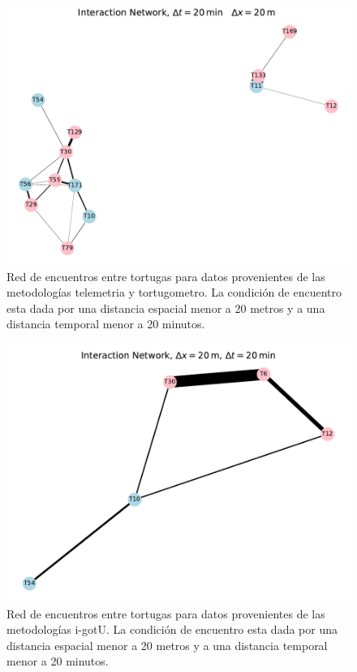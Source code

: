 \begin{figure}[h]
    \begin{center}
       
   
    \includegraphics[width=\imsize]{Chap2/red_interaccion_20min_campanas.pdf}
\end{center}
    \caption[Red de encuentros entre tortugas utilizando telemetria y tortugometro.]{Red de encuentros entre tortugas para datos provenientes de las metodologías telemetria y tortugometro. La condición de encuentro esta dada por una distancia espacial menor a 20 metros y a una distancia temporal menor a 20 minutos.}
    \label{fig:redInteraccion20mincampanas}
\end{figure}



\begin{figure}[h]
    \begin{center}
       
   
    \includegraphics[width=\imsize]{Chap2/red_interaccion_20min_IGOTO.pdf}
\end{center}
    \caption[Red de encuentros entre tortugas utilizando i-gotU.]{Red de encuentros entre tortugas para datos provenientes de las metodologías i-gotU. La condición de encuentro esta dada por una distancia espacial menor a 20 metros y a una distancia temporal menor a 20 minutos.}
    \label{fig:redInteraccion20igotu}
\end{figure}


